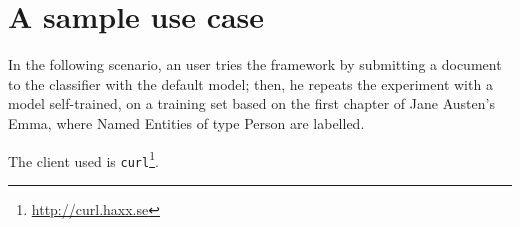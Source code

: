 \documentclass[a4paper,11pt]{report}
\begin{document}

\section{A sample use case}
In the following scenario, an user tries the framework by submitting a document to the classifier with the default model; then, he repeats the experiment with a model self-trained, on a training set based on the first chapter of Jane Austen's Emma, where Named Entities of type Person are labelled.

The client used is \texttt{curl}\footnote{\url{http://curl.haxx.se}}.

\cleardoublepage
{}

\nocite{*}
\end{document}
